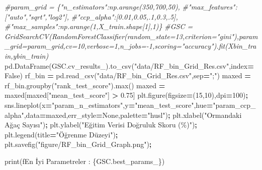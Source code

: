 \documentclass[12pt,twoside]{deuthesis}
\newenvironment{Shaded}{\begin{snugshade}}{\end{snugshade}}
\newcommand{\BuiltInTok}[1]{#1}
\newcommand{\CommentTok}[1]{\textcolor[rgb]{0.56,0.35,0.01}{\textit{#1}}}
\newcommand{\DecValTok}[1]{\textcolor[rgb]{0.00,0.00,0.81}{#1}}
\newcommand{\FloatTok}[1]{\textcolor[rgb]{0.00,0.00,0.81}{#1}}
\newcommand{\NormalTok}[1]{#1}
\newcommand{\OperatorTok}[1]{\textcolor[rgb]{0.81,0.36,0.00}{\textbf{#1}}}
\newcommand{\SpecialCharTok}[1]{\textcolor[rgb]{0.00,0.00,0.00}{#1}}
\newcommand{\SpecialStringTok}[1]{\textcolor[rgb]{0.31,0.60,0.02}{#1}}
\newcommand{\StringTok}[1]{\textcolor[rgb]{0.31,0.60,0.02}{#1}}
\newcommand{\VariableTok}[1]{\textcolor[rgb]{0.00,0.00,0.00}{#1}}
\begin{document}
\begin{Shaded}
\begin{Highlighting}[]
\CommentTok{\#param\_grid = \{"n\_estimators":np.arange(350,700,50),}
              \CommentTok{\#"max\_features":["auto","sqrt","log2"],}
              \CommentTok{\#"ccp\_alpha":[0.01,0.05,.1,0.3,.5],}
              \CommentTok{\#"max\_samples":np.arange(1,X\_train.shape[1],1)\}}
\CommentTok{\#GSC = GridSearchCV(RandomForestClassifier(random\_state=13,criterion="gini"),param\_grid=param\_grid,cv=10,verbose=1,n\_jobs={-}1,scoring="accuracy").fit(Xbin\_train,ybin\_train)}
\NormalTok{pd.DataFrame(GSC.cv\_results\_).to\_csv(}\StringTok{"data/RF\_bin\_Grid\_Res.csv"}\NormalTok{,index}\OperatorTok{=}\VariableTok{False}\NormalTok{)}
\NormalTok{rf\_bin }\OperatorTok{=}\NormalTok{ pd.read\_csv(}\StringTok{"data/RF\_bin\_Grid\_Res.csv"}\NormalTok{,sep}\OperatorTok{=}\StringTok{";"}\NormalTok{)}
\NormalTok{maxed }\OperatorTok{=}\NormalTok{ rf\_bin.groupby(}\StringTok{"rank\_test\_score"}\NormalTok{).}\BuiltInTok{max}\NormalTok{()}
\NormalTok{maxed }\OperatorTok{=}\NormalTok{ maxed[maxed[}\StringTok{"mean\_test\_score"}\NormalTok{] }\OperatorTok{\textgreater{}} \FloatTok{0.75}\NormalTok{]}
\NormalTok{plt.figure(figsize}\OperatorTok{=}\NormalTok{(}\DecValTok{15}\NormalTok{,}\DecValTok{10}\NormalTok{),dpi}\OperatorTok{=}\DecValTok{100}\NormalTok{)}\OperatorTok{;}
\NormalTok{sns.lineplot(x}\OperatorTok{=}\StringTok{"param\_n\_estimators"}\NormalTok{,y}\OperatorTok{=}\StringTok{"mean\_test\_score"}\NormalTok{,hue}\OperatorTok{=}\StringTok{"param\_ccp\_alpha"}\NormalTok{,data}\OperatorTok{=}\NormalTok{maxed,err\_style}\OperatorTok{=}\VariableTok{None}\NormalTok{,palette}\OperatorTok{=}\StringTok{"husl"}\NormalTok{)}\OperatorTok{;}
\NormalTok{plt.xlabel(}\StringTok{"Ormandaki Ağaç Sayısı"}\NormalTok{)}\OperatorTok{;}
\NormalTok{plt.ylabel(}\StringTok{"Eğitim Verisi Doğruluk Skoru (\%)"}\NormalTok{)}\OperatorTok{;}
\NormalTok{plt.legend(title}\OperatorTok{=}\StringTok{"Öğrenme Düzeyi"}\NormalTok{)}\OperatorTok{;}
\NormalTok{plt.savefig(}\StringTok{"figure/RF\_bin\_Grid\_Graph.png"}\NormalTok{)}\OperatorTok{;}
\end{Highlighting}
\end{Shaded}
\begin{Shaded}
\begin{Highlighting}[]
\BuiltInTok{print}\NormalTok{(}\SpecialStringTok{f\textquotesingle{}En İyi Parametreler : }\SpecialCharTok{\{}\NormalTok{GSC}\SpecialCharTok{.}\NormalTok{best\_params\_}\SpecialCharTok{\}}\SpecialStringTok{\textquotesingle{}}\NormalTok{)}
\end{Highlighting}
\end{Shaded}
\end{document}
